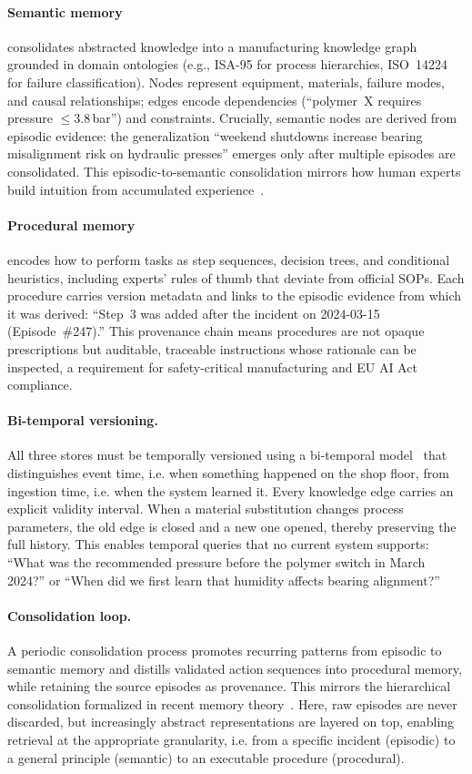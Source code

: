 \documentclass[]{ceurart}
\begin{document}
\paragraph{Semantic memory} consolidates abstracted knowledge into a
manufacturing knowledge graph grounded in domain ontologies (e.g.,
ISA-95 for process hierarchies, ISO~14224 for failure
classification). Nodes represent equipment, materials, failure modes, and
causal relationships; edges encode dependencies (``polymer~X requires
pressure $\leq$3.8\,bar'') and constraints. Crucially, semantic
nodes are derived from episodic evidence: the generalization
``weekend shutdowns increase bearing misalignment risk on hydraulic
presses'' emerges only after multiple episodes are consolidated.
This episodic-to-semantic consolidation mirrors how human experts build
intuition from accumulated experience~\cite{gam2026}.

\paragraph{Procedural memory} encodes how to perform tasks as
step sequences, decision trees, and conditional heuristics, including
experts' rules of thumb that deviate from official SOPs. Each procedure
carries version metadata and links to the episodic evidence from which
it was derived: ``Step~3 was added after the incident on 2024-03-15
(Episode~\#247).'' This provenance chain means procedures are not
opaque prescriptions but auditable, traceable instructions whose
rationale can be inspected, a requirement for safety-critical
manufacturing and EU AI Act compliance.

\paragraph{Bi-temporal versioning.}
All three stores must be temporally versioned using a
bi-temporal model~\cite{rasmussen2025} that distinguishes event
time, i.e. when something happened on the shop floor, from ingestion
time, i.e. when the system learned it. Every knowledge edge carries an
explicit validity interval. When a material substitution changes process
parameters, the old edge is closed and a new one opened, thereby preserving the
full history. This enables temporal queries that no current system
supports: ``What was the recommended pressure before the polymer
switch in March 2024?'' or ``When did we first learn that humidity
affects bearing alignment?''

\paragraph{Consolidation loop.}
A periodic consolidation process promotes recurring patterns from
episodic to semantic memory and distills validated action sequences into
procedural memory, while retaining the source episodes as provenance.
This mirrors the hierarchical consolidation formalized in recent memory
theory~\cite{timem2026}. Here, raw episodes are never discarded, but
increasingly abstract representations are layered on top, enabling
retrieval at the appropriate granularity, i.e. from a specific incident
(episodic) to a general principle (semantic) to an executable procedure
(procedural).
\end{document}
